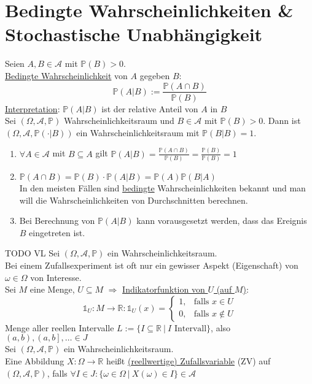 \documentclass[a4paper]{article}
\newcommand{\ul}{\underline}
\begin{document}
\section{Bedingte Wahrscheinlichkeiten \& Stochastische Unabhängigkeit}
Seien $A,B\in\mathcal{A}$ mit $\mathbb{P}(B)>0$.\\
\ul{Bedingte Wahrscheinlichkeit} von $A$ gegeben $B$: $$\mathbb{P}(A\vert B):=\frac{\mathbb{P}(A\cap B)}{\mathbb{P}(B)}$$
\ul{Interpretation}: $\mathbb{P}(A\vert B)$ ist der relative Anteil von $A$ in $B$\\
Sei $(\Omega,\mathcal{A},\mathbb{P})$ Wahrscheinlichkeitsraum und $B\in\mathcal{A}$ mit $\mathbb{P}(B)>0$. Dann ist $(\Omega,\mathcal{A},\mathbb{P}(\cdot\vert B))$ ein Wahrscheinlichkeitsraum mit $\mathbb{P}(B\vert B)=1$.
\begin{enumerate}[1)]
	\item $\forall A\in\mathcal{A}$ mit $B\subseteq A$ gilt $\mathbb{P}(A\vert B)=\frac{\mathbb{P}(A\cap B)}{\mathbb{P}(B)}=\frac{\mathbb{P}(B)}{\mathbb{P}(B)}=1$
	\item $\mathbb{P}(A\cap B)=\mathbb{P}(B)\cdot\mathbb{P}(A\vert B)=\mathbb{P}(A)\mathbb{P}(B\vert A)$\\
	In den meisten Fällen sind \ul{bedingte} Wahrscheinlichkeiten bekannt und man will die Wahrscheinlichkeiten von Durchschnitten berechnen.
	\item Bei Berechnung von $\mathbb{P}(A\vert B)$ kann vorausgesetzt werden, dass das Ereignis $B$ eingetreten ist.
\end{enumerate}
TODO VL
Sei $(\Omega,\mathcal{A},\mathbb{P})$ ein Wahrscheinlichkeitsraum.\\
Bei einem Zufallsexperiment ist oft nur ein gewisser Aspekt (Eigenschaft) von $\omega\in\Omega$ von Interesse.\\
Sei $M$ eine Menge, $U\subseteq M$ $\Rightarrow$ \ul{Indikatorfunktion von $U$ (auf $M$)}:
$$\mathds{1}_U:M\rightarrow\mathbb{R}:\mathds{1}_U(x)=\begin{cases}
1, & \text{falls }x\in U\\
0, & \text{falls }x\notin U
\end{cases}$$
Menge aller reellen Intervalle $L:=\{I\subseteq\mathbb{R}\ \vert\ I\text{ Intervall}\}$, also $(a,b),\left(a,b\right],\dots\in J$\\
Sei $(\Omega,\mathcal{A},\mathbb{P})$ ein Wahrscheinlichkeitsraum.\\
Eine Abbildung $X:\Omega\rightarrow\mathbb{R}$ heißt \ul{(reellwertige) Zufallsvariable} (ZV) auf $(\Omega,\mathcal{A},\mathbb{P})$, falls $\forall I\in J:\{\omega\in\Omega\ \vert\ X(\omega)\in I\}\in\mathcal{A}$\\
\end{document}
